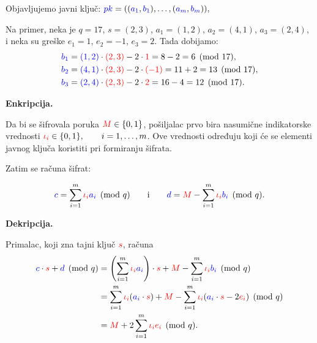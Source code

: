 Objavljujemo javni ključ:
$ \textcolor{blue}{pk} = ((\textcolor{blue}{a_1},\textcolor{blue}{b_1}),\ldots,(\textcolor{blue}{a_m},\textcolor{blue}{b_m})), $

Na primer, neka je $q=17$, $s=(2,3)$,
$a_1=(1,2)$, $a_2=(4,1)$, $a_3=(2,4)$,
i neka su greške $e_1=1$, $e_2=-1$, $e_3=2$.
Tada dobijamo:
\[ 
\begin{aligned} 
    {\color{blue}b_1} &= {\color{blue}(1,2)}\cdot{\color{red}(2,3)} - 2\cdot {\color{red}1} = 8 - 2 = 6 \pmod {17}, \\ 
    {\color{blue}b_2} &= {\color{blue}(4,1)}\cdot{\color{red}(2,3)} - 2\cdot{\color{red}(-1)} = 11 + 2 = 13 \pmod {17}, \\ 
    {\color{blue}b_3} &= {\color{blue}(2,4)}\cdot{\color{red}(2,3)} - 2\cdot {\color{red}2} = 16 - 4 = 12 \pmod {17}. 
\end{aligned} 
\]

\noindent\textbf{Enkripcija.}

Da bi se šifrovala poruka ${\color{red}M} \in \{0,1\}$, pošiljalac prvo bira nasumične indikatorske vrednosti
$ {\color{red}\iota_i} \in \{0,1\}, \qquad i=1,\ldots,m $.
Ove vrednosti određuju koji će se elementi javnog ključa koristiti pri formiranju šifrata. 

Zatim se računa šifrat:

\[
    {\color{blue}c} = \sum_{i=1}^{m} {\color{red}\iota_i} {\color{blue}a_i} \pmod q
\qquad
\text{i}
\qquad
    {\color{blue}d} = {\color{red}M} - \sum_{i=1}^{m} {\color{red}\iota_i} {\color{blue}b_i} \pmod q.
\]

\noindent\textbf{Dekripcija.}

Primalac, koji zna tajni ključ ${\color{red}s}$, računa
\[
    \begin{aligned}
        {\color{blue}c} \cdot {\color{red}s} + {\color{blue}d} \pmod q
        &=
        \left(\sum_{i=1}^{m} {\color{red}\iota_i} {\color{blue}a_i}\right) \cdot {\color{red}s}
        + {\color{red}M}
        - \sum_{i=1}^{m} {\color{red}\iota_i} {\color{blue}b_i} \pmod q \\
        &=
        \sum_{i=1}^{m} {\color{red}\iota_i} ({\color{blue}a_i} \cdot {\color{red}s})
        + {\color{red}M}
        - \sum_{i=1}^{m} {\color{red}\iota_i} ({\color{blue}a_i} \cdot {\color{red}s} - 2{\color{red}e_i}) \pmod q \\
        &=
        {\color{red}M} + 2\sum_{i=1}^{m} {\color{red}\iota_i} {\color{red}e_i} \pmod q.
    \end{aligned}
\]

